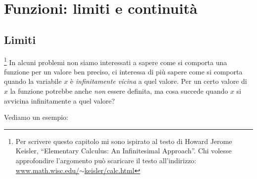 


\chapter{Funzioni: limiti e continuità}

\section{Limiti}
\label{sec:cont_limiti}

\footnote{Per scrivere questo capitolo mi sono ispirato 
al testo di Howard Jerome Keisler, 
``Elementary Calculus: An Infinitesimal Approach''. 
Chi volesse approfondire l'argomento può scaricare il testo all'indirizzo: 
\href{https://www.math.wisc.edu/~keisler/calc.html}
     {www.math.wisc.edu/\(\sim\)keisler/calc.html}}
In alcuni problemi non siamo interessati a sapere come si comporta una funzione 
per un valore ben preciso, ci interessa di più 
sapere come si comporta quando la variabile \(x\) è \emph{infinitamente 
vicina} a quel valore.
Per un certo valore di \(x\) la funzione potrebbe anche \emph{non} essere 
definita, ma cosa succede quando \(x\) si avvicina infinitamente a quel 
valore?

Vediamo un esempio:

